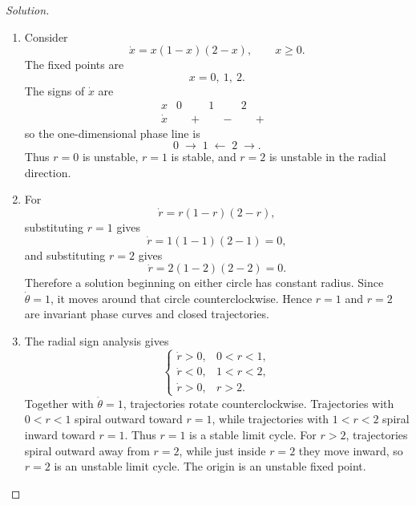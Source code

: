 \documentclass[12pt]{amsart}
\theoremstyle{plain}
\theoremstyle{definition}
\theoremstyle{definition}
\theoremstyle{plain}
\newenvironment{solution}
{\begin{proof}[Solution]}
{\end{proof}}
\begin{document}
\begin{enumerate}[label=\arabic*.]
\begin{solution}
\begin{enumerate}[label=(\alph*)]
                \item Consider
                \[
                    \dot x=x(1-x)(2-x),\qquad x\ge0.
                \]
                The fixed points are
                \[
                    x=0,\ 1,\ 2.
                \]
                The signs of $\dot x$ are
                \[
                    \begin{array}{c|ccccccc}
                        x & 0 && 1 && 2 && {}\\ \hline
                        \dot x && + && - && + &
                    \end{array}
                \]
                so the one-dimensional phase line is
                \[
                    0\;\longrightarrow\;1\;\longleftarrow\;2\;\longrightarrow.
                \]
                Thus $r=0$ is unstable, $r=1$ is stable, and $r=2$ is unstable in the radial direction.

                \item For
                \[
                    \dot r=r(1-r)(2-r),
                \]
                substituting $r=1$ gives
                \[
                    \dot r=1(1-1)(2-1)=0,
                \]
                and substituting $r=2$ gives
                \[
                    \dot r=2(1-2)(2-2)=0.
                \]
                Therefore a solution beginning on either circle has constant radius. Since $\dot\theta=1$, it moves around that circle counterclockwise. Hence $r=1$ and $r=2$ are invariant phase curves and closed trajectories.

                \item The radial sign analysis gives
                \[
                    \begin{cases}
                        \dot r>0, & 0<r<1,\\
                        \dot r<0, & 1<r<2,\\
                        \dot r>0, & r>2.
                    \end{cases}
                \]
                Together with $\dot\theta=1$, trajectories rotate counterclockwise. Trajectories with $0<r<1$ spiral outward toward $r=1$, while trajectories with $1<r<2$ spiral inward toward $r=1$. Thus $r=1$ is a stable limit cycle. For $r>2$, trajectories spiral outward away from $r=2$, while just inside $r=2$ they move inward, so $r=2$ is an unstable limit cycle. The origin is an unstable fixed point.
            \end{enumerate}
        \end{solution}
    \end{enumerate}
\end{document}
